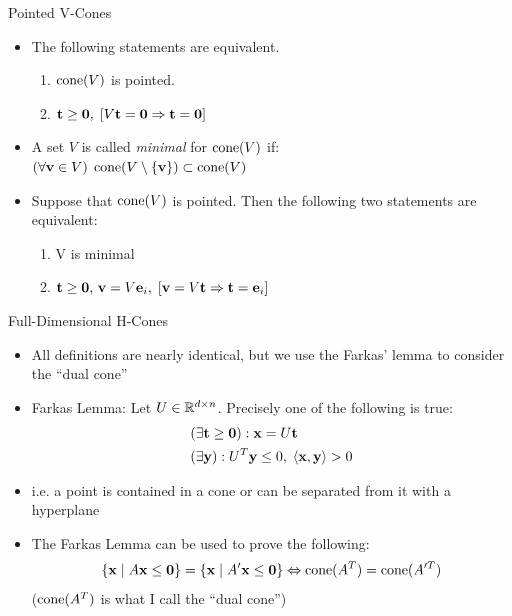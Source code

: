 \documentclass{beamer}
\begin{document}
\begin{frame}{Pointed V-Cones}
\begin{itemize}
  \item The following statements are equivalent.
    \begin{enumerate}
      \item $\operatorname{cone}(V)$ is pointed.
      \item $\mathbf{t}\geq\mathbf{0},\; [V\mathbf{t}=\mathbf{0} \Rightarrow \mathbf{t}=\mathbf{0}]$
    \end{enumerate}

  \item A set $V$ is called \textit{minimal} for $\operatorname{cone}(V)$ if:\\
  $(\forall \mathbf{v} \in V)\; \operatorname{cone}(V\setminus\{\mathbf{v}\}) \subset \operatorname{cone}(V)$

	\item Suppose that $\operatorname{cone}(V)$ is pointed.  Then the following two statements are equivalent:
	\begin{enumerate}
		\item V is minimal
		\item $\mathbf{t}\geq\mathbf{0},\,\mathbf{v}=V\mathbf{e}_i,\; [\mathbf{v}=V\mathbf{t} \Rightarrow \mathbf{t}=\mathbf{e}_i]$
	\end{enumerate}
\end{itemize}
\end{frame}

\begin{frame}{Full-Dimensional H-Cones}
\begin{itemize}
  \item All definitions are nearly identical, but we use the Farkas' lemma to consider the ``dual cone''
  \item Farkas Lemma:
    Let $U \in \mathbb{R}^{d\times n}$.  Precisely one of the following is true:
    \begin{align*}
       & (\exists \mathbf{t} \geq \mathbf{0}) : \mathbf{x} = U\mathbf{t}                \\
       & (\exists \mathbf{y}) : U^T\mathbf{y} \leq 0,\; \left\langle \mathbf{x}, \mathbf{y} \right\rangle > 0
    \end{align*}
  \item i.e. a point is contained in a cone or can be separated from it with a hyperplane
  \item The Farkas Lemma can be used to prove the following: 
    \[\left\{\mathbf{x}\;|\; A\mathbf{x}\leq\mathbf{0}\right\} = \left\{\mathbf{x}\;|\; A'\mathbf{x}\leq\mathbf{0}\right\} \Leftrightarrow \operatorname{cone}(A^T) = \operatorname{cone}(A'^T)\]
    ($\operatorname{cone}(A^T)$ is what I call the ``dual cone'')
\end{itemize}
\end{frame}
\end{document}
